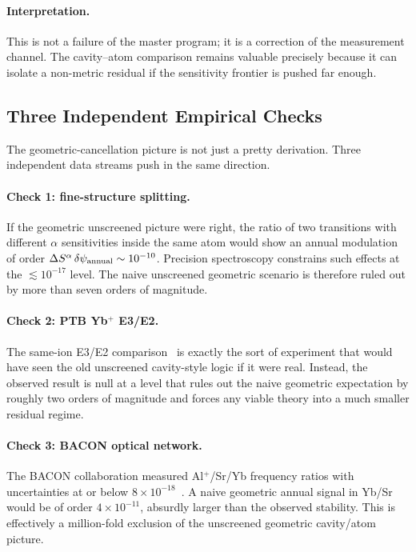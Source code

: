 \paragraph{Interpretation.}
This is not a failure of the master program; it is a correction of the measurement channel.  The cavity--atom comparison remains valuable precisely because it can isolate a non-metric residual if the sensitivity frontier is pushed far enough.

\subsection{Three Independent Empirical Checks}\label{sec:cavity-checks}

The geometric-cancellation picture is not just a pretty derivation.  Three independent data streams push in the same direction.

\paragraph{Check 1: fine-structure splitting.}
If the geometric unscreened picture were right, the ratio of two transitions with different $\alpha$ sensitivities inside the same atom would show an annual modulation of order $\Delta S^\alpha\,\delta\psi_{\rm annual}\sim 10^{-10}$.  Precision spectroscopy constrains such effects at the $\lesssim10^{-17}$ level.  The naive unscreened geometric scenario is therefore ruled out by more than seven orders of magnitude.

\paragraph{Check 2: PTB Yb$^+$ E3/E2.}
The same-ion E3/E2 comparison~\cite{Lange2021} is exactly the sort of experiment that would have seen the old unscreened cavity-style logic if it were real.  Instead, the observed result is null at a level that rules out the naive geometric expectation by roughly two orders of magnitude and forces any viable theory into a much smaller residual regime.

\paragraph{Check 3: BACON optical network.}
The BACON collaboration measured Al$^+$/Sr/Yb frequency ratios with uncertainties at or below $8\times10^{-18}$~\cite{Beloy2021}.  A naive geometric annual signal in Yb/Sr would be of order $4\times10^{-11}$, absurdly larger than the observed stability.  This is effectively a million-fold exclusion of the unscreened geometric cavity/atom picture.


